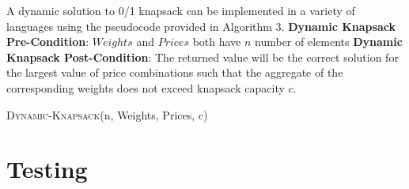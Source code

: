 \documentclass[onecolumn, 12pt, article]{IEEEtran}
\numberwithin{case}{problem}
\numberwithin{condition}{problem}
\numberwithin{condition}{subsection}
\numberwithin{definition}{section}
\theoremstyle{remark}
\numberwithin{question}{problem}
\theoremstyle{plain}
\numberwithin{answer}{problem}
\numberwithin{solution}{section}
\numberwithin{equation}{section}%
\begin{document}
A dynamic solution to 0/1 knapsack can be implemented in a variety of languages using the pseudocode provided in Algorithm 3.
\newline
\textbf{Dynamic Knapsack Pre-Condition}: $Weights$ and $Prices$ both have $n$ number of elements
\newline
\textbf{Dynamic Knapsack Post-Condition}: The returned value will be the correct solution for the largest value of price combinations such that the aggregate of the corresponding weights does not exceed knapsack capacity $c$.
\begin{algorithm}
\caption {\textsc{Dynamic-Knapsack}(n, Weights, Prices, c)}
\label{algo:dynamic}
\begin{algorithmic}[1]
\EndIf
{}
\EndIf
{}
	\EndFor
\EndFor
{}
		\EndIf
		\EndIf
	\EndFor
\EndFor
{}
\EndProcedure
\end{algorithmic}
\end{algorithm}
\newline
\newline
\newline


\section{Testing}
\end{document}
